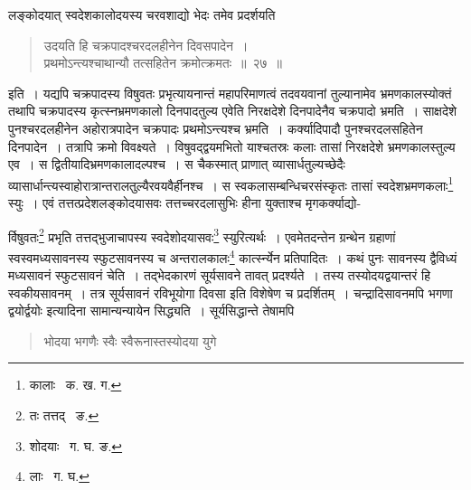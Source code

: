 \documentclass[11pt, openany]{book}
\begin{document}
\indent लङ्कोदयात् स्वदेशकालोदयस्य चरवशाद्यो भेदः तमेव प्रदर्शयति\textendash 

\begin{quote}
{\ab उदयति हि चक्रपादश्चरदलहीनेन दिवसपादेन~। \\
 प्रथमोऽन्त्यश्चाथान्यौ तत्सहितेन क्रमोत्क्रमतः~॥~२७~॥} 
\end{quote}

\indent इति~। यद्यपि चक्रपादस्य विषुवतः प्रभृत्यायनान्तं महापरिमाणत्वं तदवयवानां तुल्यानामेव भ्रमणकालस्योक्तं तथापि चक्रपादस्य कृत्स्नभ्रमणकालो दिनपादतुल्य एवेति निरक्षदेशे दिनपादेनैव चक्रपादो भ्रमति~। साक्षदेशे पुनश्चरदलहीनेन अहोरात्रपादेन चक्रपादः
प्रथमोऽन्त्यश्च भ्रमति~। कर्क्यादिपादौ पुनश्चरदलसहितेन दिनपादेन~। तत्रापि क्रमो विवक्ष्यते~। विषुवद्द्वयमभितो याश्चतस्रः कलाः तासां निरक्षदेशे भ्रमणकालस्तुल्य एव~। स द्वितीयादिभ्रमणकालादल्पश्च~। स चैकस्मात् प्राणात् व्यासार्धतुल्यच्छेदैः
व्यासार्धान्त्यस्वाहोरात्रान्तरालतुल्यैरवयवैर्हीनश्च~। स स्वकलासम्बन्धिचरसंस्कृतः तासां स्वदेशभ्रमणकलाः\renewcommand{\thefootnote}{१}\footnote{कालाः \textendash\ क. ख. ग.} स्युः~। एवं 
तत्तत्प्रदेशलङ्कोदयासवः तत्तच्चरदलासुभिः हीना युक्ताश्च मृगकर्क्याद्यो-

\newpage

\noindent र्विषुवतः\renewcommand{\thefootnote}{१}\footnote{तः तत्तद् \textendash\ ङ.} प्रभृति तत्तद्भुजाचापस्य स्वदेशोदयासवः\renewcommand{\thefootnote}{२}\footnote{शोदयाः \textendash\ ग. घ. ङ.}
स्युरित्यर्थः~। एवमेतदन्तेन ग्रन्थेन ग्रहाणां स्वस्वमध्यसावनस्य स्फुटसावनस्य च अन्तरालकालः\renewcommand{\thefootnote}{३}\footnote{लाः \textendash\ ग. घ.} कार्त्स्न्येन प्रतिपादितः~। कथं पुनः सावनस्य द्वैविध्यं मध्यसावनं स्फुटसावनं चेति~। तद्भेदकारणं सूर्यसावने तावत् प्रदर्श्यते~। तस्य तस्योदयद्वयान्तरं हि स्वकीयसावनम्~। तत्र सूर्यसावनं {\qt रविभूयोगा दिवसा} इति विशेषेण च प्रदर्शितम्~। चन्द्रादिसावनमपि {\qt भगणा द्वयोर्द्वयोः} इत्यादिना सामान्यन्यायेन सिद्ध्यति~। सूर्यसिद्धान्ते तेषामपि\textendash

\begin{quote}
{\qt भोदया भगणैः स्वैः स्वैरूनास्तस्योदया युगे}
\end{quote} 
\end{document}
